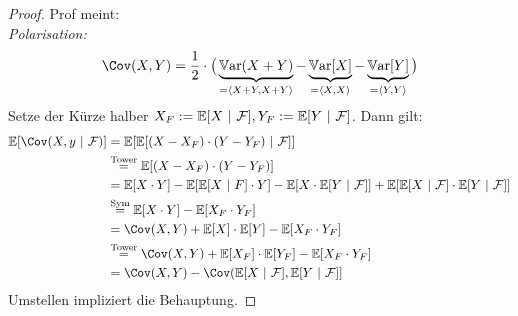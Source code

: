 \documentclass[12pt,a4paper]{article}
\begin{document}
\begin{proof}
Prof meint:\\
\textit{Polarisation:} 
\begin{align*}
\Cov(X,Y)=\frac{1}{2}\cdot\big(\underbrace{\Var(X+Y)}_{=\langle X+Y,X+Y\rangle}-\underbrace{\Var[X]}_{=\langle X,X\rangle}-\underbrace{\Var[Y]}_{=\langle Y,Y\rangle}\big)
\end{align*}
Setze der Kürze halber $X_F:=\mathbb{E}[X~|~\mathcal{F}], Y_F:=\mathbb{E}[Y~|~\mathcal{F}]$. Dann gilt:
\begin{align*}
\E[\Cov(X,y~|~\F)]
&=\E[\E[(X-X_F)\cdot(Y-Y_F)~|~\F]]\\
&\stackeq{\text{Tower}}
\E[(X-X_F)\cdot(Y-Y_F)]\\
&=\E[X\cdot Y]-\E[\E[X~|~F]\cdot Y]
-\E[X\cdot\E[Y~|~\F]]+\E[\E[X~|~\F]\cdot\E[Y~|~\F]]\\
&\stackeq{\text{Sym}}
\E[X\cdot Y]-\E[X_F\cdot Y_F]\\
&=\Cov(X,Y)+\E[X]\cdot\E[Y]-\E[X_F\cdot Y_F]\\
&\stackeq{\text{Tower}}
\Cov(X,Y)+\E[X_F]\cdot\E[Y_F]-\E[X_F\cdot Y_F]\\
&=\Cov(X,Y)-\Cov(\E[X~|~\F],\E[Y~|~\F]]
\end{align*}
Umstellen impliziert die Behauptung.
\end{proof}
\end{document}
